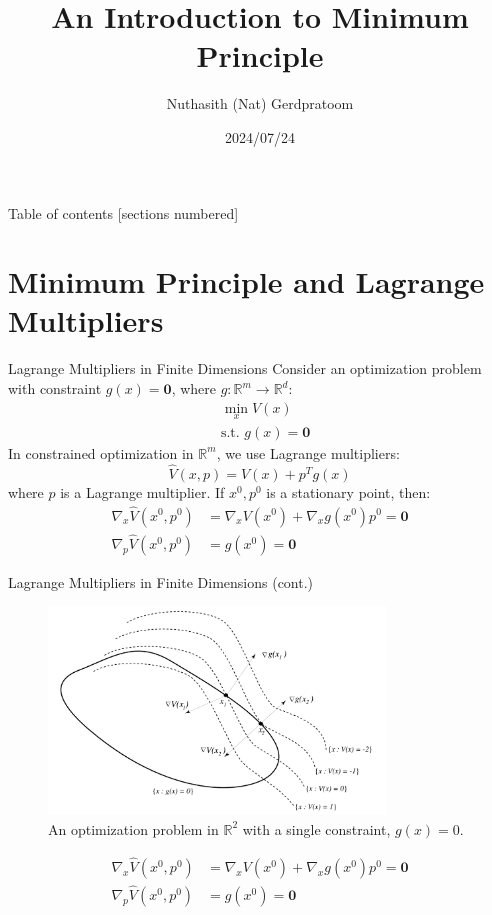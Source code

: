\documentclass[10pt]{beamer}
\title{An Introduction to Minimum Principle}
\date{2024/07/24}
\author{Nuthasith (Nat) Gerdpratoom}
\institute{Control \& Optimization Laboratory}
\begin{document}
\maketitle

\begin{frame}{Table of contents}
  [sections numbered]
  \tableofcontents%
\end{frame}

\section{Minimum Principle and Lagrange Multipliers}

\begin{frame}{Lagrange Multipliers in Finite Dimensions}
  Consider an optimization problem with constraint \( g(x) = \mathbf{0} \), where \(g:\mathbb{R}^{m}\rightarrow \mathbb{R}^{d}\):
  \[
    \begin{aligned}
      &\min_x V(x) \\
      &\text{s.t. } g(x) = \mathbf{0}
    \end{aligned}
  \]
  In constrained optimization in \( \mathbb{R}^m \), we use Lagrange multipliers:
  \[
  \hat{V}(x, p) = V(x) + p^T g(x)
  \]
  where \( p \) is a Lagrange multiplier. If \( x^0, p^0 \) is a stationary point, then:
  \[
  \begin{aligned}
    \nabla_x \hat{V}(x^0, p^0) &= \nabla_x V(x^0) + \nabla_x g(x^0) p^0 = \mathbf{0}\\
    \nabla_p \hat{V}(x^0, p^0) &= g(x^0) = \mathbf{0}
  \end{aligned}
  \]
  \end{frame}

\begin{frame}{Lagrange Multipliers in Finite Dimensions (cont.)}
  \begin{figure}
      \centering
      \includegraphics[width=0.8\textwidth]{photos/1.png}
      \caption{An optimization problem in \( \mathbb{R}^2 \) with a single constraint, $g(x)=0$.}
  \end{figure}
  \[
    \begin{aligned}
      \nabla_x \hat{V}(x^0, p^0) &= \nabla_x V(x^0) + \nabla_x g(x^0) p^0 = \mathbf{0}\\
      \nabla_p \hat{V}(x^0, p^0) &= g(x^0) = \mathbf{0}
    \end{aligned}
  \]
\end{frame}
\end{document}
